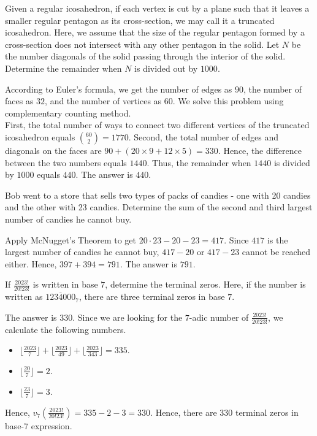 \begin{problem}
Given a regular icosahedron, if each vertex is cut by a plane such that it leaves a smaller regular pentagon as its cross-section, we may call it a truncated icosahedron. Here, we assume that the size of the regular pentagon formed by a cross-section does not intersect with any other pentagon in the solid. Let $N$ be the number diagonals of the solid passing through the interior of the solid. Determine the remainder when $N$ is divided out by $1000$.
\end{problem}

\begin{solution}
According to Euler's formula, we get the number of edges as $90$, the number of faces as $32$, and the number of vertices as $60$. We solve this problem using complementary counting method.\\
\bigskip
First, the total number of ways to connect two different vertices of the truncated icosahedron equals $\binom{60}{2}=1770$. Second, the total number of edges and diagonals on the faces are $90+(20\times9+12\times5)=330$. Hence, the difference between the two numbers equals $1440$. Thus, the remainder when $1440$ is divided by $1000$ equals $440$. The answer is $440$.
\end{solution}

\begin{problem}
Bob went to a store that sells two types of packs of candies - one with 20 candies and the other with 23 candies. Determine the sum of the second and third largest number of candies he cannot buy.
\end{problem}

\begin{solution}
Apply McNugget's Theorem to get $20\cdot23-20-23=417$. Since $417$ is the largest number of candies he cannot buy, $417-20$ or $417-23$ cannot be reached either. Hence, $397+394=791$. The answer is $791$.
\end{solution}

\begin{problem}
If $\frac{2023!}{20!23!}$ is written in base $7$, determine the terminal zeros. Here, if the number is written as $\overline{1234000}_7$, there are three terminal zeros in base $7$.
\end{problem}

\begin{solution}
The answer is $330$. Since we are looking for the $7$-adic number of $\frac{2023!}{20!23!}$, we calculate the following numbers.
\begin{itemize}
\item $\lfloor \frac{2023}{7}\rfloor + \lfloor \frac{2023}{49} \rfloor + \lfloor \frac{2023}{343}\rfloor = 335$.
\item $\lfloor \frac{20}{7} \rfloor = 2$.
\item $\lfloor \frac{23}{7} \rfloor =3$.
\end{itemize}
Hence, $v_7(\frac{2023!}{20!23!})=335-2-3=330$. Hence, there are $330$ terminal zeros in base-$7$ expression.
\end{solution}

